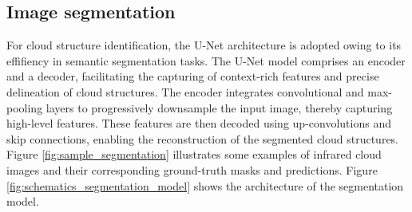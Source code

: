 \documentclass[amt, article]{copernicus}
\begin{document}
\subsection{Image segmentation}

For cloud structure identification, the U-Net architecture is adopted owing to its effifiency in semantic segmentation tasks. The U-Net model comprises an encoder and a decoder, facilitating the capturing of context-rich features and precise delineation of cloud structures. The encoder integrates convolutional and max-pooling layers to progressively downsample the input image, thereby capturing high-level features. These features are then decoded using up-convolutions and skip connections, enabling the reconstruction of the segmented cloud structures.  Figure \ref{fig:sample_segmentation} illustrates some examples of infrared cloud images and their corresponding ground-truth masks and predictions. Figure \ref{fig:schematics_segmentation_model} shows the architecture of the segmentation model.
\end{document}
